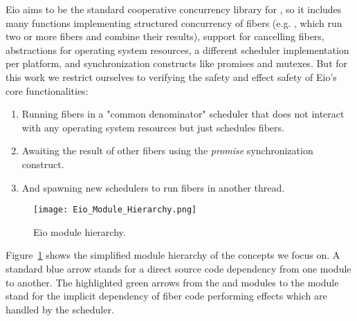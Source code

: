 Eio aims to be the standard cooperative concurrency library for \ocf{},
so it includes many functions implementing structured concurrency of fibers (e.g. , which run two or more fibers and combine their results),
support for cancelling fibers, abstractions for operating system resources,
a different scheduler implementation per platform, and synchronization constructs like promises and mutexes.
But for this work we restrict ourselves to verifying the safety and effect safety of Eio's core functionalities:
\begin{enumerate}
    \item Running fibers in a "common denominator" scheduler that does not interact with any operating system resources but just schedules fibers.
    \item Awaiting the result of other fibers using the \emph{promise} synchronization construct.
    \item And spawning new schedulers to run fibers in another thread.
\end{enumerate}

\begin{figure}[ht]
    \centering
    \texttt{[image: Eio\_Module\_Hierarchy.png]}
    \caption{Eio module hierarchy.}
    \label{fig:eio-module-hierarchy}
\end{figure}

Figure~\ref{fig:eio-module-hierarchy} shows the simplified module hierarchy of the concepts we focus on.
A standard blue arrow stands for a direct source code dependency from one module to another.
The highlighted green arrows from the  and  modules to the  module stand for the implicit dependency of fiber code performing effects which are handled by the scheduler.

